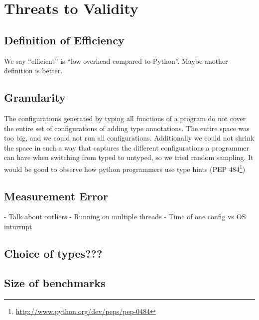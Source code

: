 \section{Threats to Validity}

\subsection{Definition of Efficiency}

We say ``efficient'' is ``low overhead compared to Python''.
Maybe another definition is better.

\subsection{Granularity}
The configurations generated by typing all functions of a program do not
cover the entire set of configurations of adding type annotations.
The entire space was too big, and we could not run all configurations.
Additionally we could not shrink the space in such a way that captures
the different configurations a programmer can have when
switching from typed to untyped, so we tried random sampling.
It would be good to observe how python programmers use
type hints (PEP 484\footnote{\url{http://www.python.org/dev/peps/pep-0484}})

\subsection{Measurement Error}
- Talk about outliers
- Running on multiple threads
- Time of one config vs OS inturrupt

\subsection{Choice of types???}

\subsection{Size of benchmarks}


